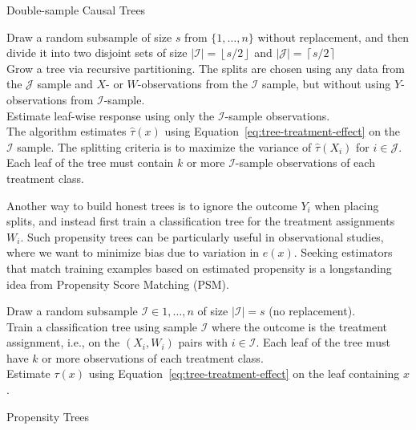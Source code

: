 \documentclass{article}
\begin{document}
\LinesNumberedHidden
\begin{algorithm}[h]

  \caption{Double-sample Causal Trees}
  \ShowLn Draw a random subsample of size $s$ from $\{1, \ldots, n\}$ without
  replacement, and then divide it into two disjoint sets of size
  $|\mathcal{I}|=\left \lfloor s/2 \right \rfloor$ and
  $|\mathcal{J}|=\left \lceil s/2 \right \rceil$ \\
  \ShowLn Grow a tree via recursive partitioning. The splits are chosen using
  any data from the $\mathcal{J}$ sample and $X$- or $W$-observations
  from the $\mathcal{I}$ sample, but without using $Y$-observations
  from $\mathcal{I}$-sample. \\
  \ShowLn Estimate leaf-wise response using only the $\mathcal{I}$-sample
  observations. \\ [1\baselineskip]

The algorithm estimates $\hat{\tau}(x)$ using
Equation~\ref{eq:tree-treatment-effect} on the $\mathcal{I}$
sample. The splitting criteria is to maximize the variance of
$\hat{\tau}(X_i)$ for $i \in \mathcal{J}$. Each leaf of the tree must
contain $k$ or more $\mathcal{I}$-sample observations of each
treatment class.
\label{algo:double-sample-trees}
\end{algorithm}
Another way to build honest trees is to ignore the outcome $Y_i$ when
placing splits, and instead first train a classification tree for the
treatment assignments $W_i$. Such propensity trees can be particularly
useful in observational studies, where we want to minimize bias due to
variation in $e(x)$. Seeking estimators that match training examples
based on estimated propensity is a longstanding idea from Propensity
Score Matching (PSM).

\LinesNumberedHidden
\begin{algorithm}[h]
  \ShowLn Draw a random subsample $\mathcal{I} \in {1, \ldots, n}$ of
  size $|\mathcal{I}| = s$ (no replacement). \\
  \ShowLn Train a classification tree using sample $\mathcal{I}$ where
  the outcome is the treatment assignment, i.e., on the $(X_i, W_i)$
  pairs with $i \in \mathcal{I}$. Each leaf of the tree must have $k$
  or more observations of each treatment class. \\
  \ShowLn Estimate $\tau(x)$ using
  Equation~\ref{eq:tree-treatment-effect} on the leaf containing $x$.
  \caption{Propensity Trees}
\end{algorithm}
\end{document}
